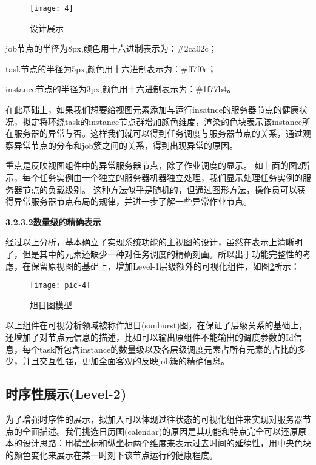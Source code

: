 \begin{figure}[h]
	\centering
	\texttt{[image: 4]}
	\caption{设计展示}
	\label{fig-4}
\end{figure}

job节点的半径为8px,颜色用十六进制表示为：\#2ca02c；

task节点的半径为5px,颜色用十六进制表示为：\#ff7f0e；

instance节点的半径为3px,颜色用十六进制表示为：\#1f77b4。

在此基础上，如果我们想要给视图元素添加与运行insatnce的服务器节点的健康状况，拟定将环绕task的instance节点群增加颜色维度，渲染的色块表示该instance所在服务器的异常与否。这样我们就可以得到任务调度与服务器节点的关系，通过观察异常节点的分布和job簇之间的关系，得到出现异常的原因。

重点是反映视图组件中的异常服务器节点，除了作业调度的显示。 如上面的图2所示，每个任务实例由一个独立的服务器机器独立处理，我们显示处理任务实例的服务器节点的负载级别。 这种方法似乎是随机的，但通过图形方法，操作员可以获得异常服务器节点布局的规律，并进一步了解一些异常作业节点。

{\textbf{3.2.3.2\quad 数量级的精确表示}}

经过以上分析，基本确立了实现系统功能的主视图的设计，虽然在表示上清晰明了，但是其中的元素还缺少一种对任务调度的精确刻画。所以出于功能完整性的考虑，在保留原视图的基础上，增加Level-1层级额外的可视化组件，如图\ref{pic-4}所示：

\begin{figure}[h]
	\centering
	\texttt{[image: pic-4]}
	\caption{旭日图模型}
	\label{pic-4}
\end{figure}

以上组件在可视分析领域被称作旭日(sunburst)图，在保证了层级关系的基础上，还增加了对节点元信息的描述，比如可以输出原组件不能输出的调度参数的Id信息，每个task所包含instance的数量级以及各层级调度元素占所有元素的占比的多少，并且交互性强，更加全面客观的反映job簇的精确信息。

\subsection{时序性展示(Level-2)}

为了增强时序性的展示，拟加入可以体现过往状态的可视化组件来实现对服务器节点的全面描述。我们挑选日历图(calendar)的原因是其功能和特点完全可以还原原本的设计思路：用横坐标和纵坐标两个维度来表示过去时间的延续性，用中央色块的颜色变化来展示在某一时刻下该节点运行的健康程度。

